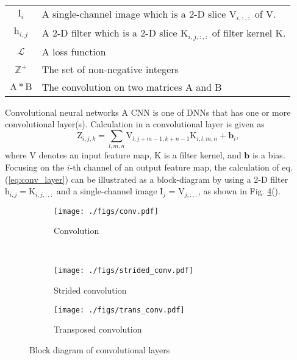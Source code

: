 \documentclass{article}
\makeatletter
\renewcommand\subsection{\@startsection{subsection}{2}{\z@}
                      {0.5ex \@plus 0ex \@minus -2ex}
                      {0.5ex \@plus 0ex}
                      {\normalfont\large\bfseries}}
\newcommand{\myvector}[1]{\boldsymbol{#1}}
\newcommand{\mymatrix}[1]{\mathrm{#1}}
\newcommand{\mytensor}[1]{\boldsymbol{\mathrm{#1}}}
\newcommand{\myset}[1]{\mathbb{#1}}
\makeatother
\begin{document}
\begin{table}[!t]
\begin{tabular}{cp{}}
      $\mymatrix{I}_i$ & A single-channel image which is a 2-D slice $\mytensor{V}_{i, :, :}$
        of $\mytensor{V}$. \\
      $\mymatrix{h}_{i, j}$ & A 2-D filter which is
        a 2-D slice $\mytensor{K}_{i, j, :, :}$ of filter kernel $\mytensor{K}$. \\
      $\mathcal{L}$ & A loss function \\
      $\myset{Z^+}$ & The set of non-negative integers \\
      $\mymatrix{A} * \mymatrix{B} $ & The convolution on two matrices
        $\mymatrix{A}$ and $\mymatrix{B}$ \\
      \hline
    \end{tabular}
    \label{tab:notation}
  \end{table}

\subsection{Convolutional neural networks}
  A CNN is one of DNNs that has one or more convolutional layer(s).
  Calculation in a convolutional layer is given as
  \begin{equation}
    \mytensor{Z}_{i, j, k} = \sum_{l, m, n} \mytensor{V}_{l, j+m-1, k+n-1}
                                            \mytensor{K}_{i, l, m, n}
                           + \myvector{b}_i,
    \label{eq:conv_layer}
  \end{equation}
  where $\mytensor{V}$ denotes an input feature map,
  $\mytensor{K}$ is a filter kernel,
  and $\myvector{b}$ is a bias.
  Focusing on the $i$-th channel of an output feature map,
  the calculation of eq. (\ref{eq:conv_layer}) can be illustrated
  as a block-diagram by using a 2-D filter $\mymatrix{h}_{i, j} = \mytensor{K}_{i, j, :, :}$
  and a single-channel image $\mymatrix{I}_j$ = $\mytensor{V}_{j, :, :}$,
  as shown in Fig. \ref{fig:block}().
\begin{figure}[!t]
  \centering
  \begin{subfigure}[t]{0.35\hsize}
    \centering
    \texttt{[image: ./figs/conv.pdf]}
    \caption{Convolution \label{fig:block_conv}}
  \end{subfigure}\\
  \begin{subfigure}[t]{0.45\hsize}
    \centering
    \texttt{[image: ./figs/strided\_conv.pdf]}
    \caption{Strided convolution \label{fig:block_strided}}
  \end{subfigure}
  \begin{subfigure}[t]{0.45\hsize}
    \centering
    \texttt{[image: ./figs/trans\_conv.pdf]}
    \caption{Transposed convolution \label{fig:block_trans}}
  \end{subfigure}
  \vspace{-2ex}
  \caption{Block diagram of convolutional layers \label{fig:block}}
\end{figure}
\end{document}
